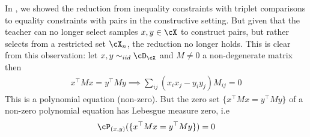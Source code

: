 In , we showed the reduction from inequality constraints with triplet comparisons to equality constraints with pairs in the constructive setting. But given that the teacher can no longer select samples $x,y \in \cX$ to construct pairs, but rather selects from a restricted set $\cX_n$, the reduction no longer holds. This is clear from this observation: let $x,y \sim_{iid} \cD_{\cX}$ and $M \neq 0$ a non-degenerate matrix then
\begin{gather*}
    x^{\top}Mx = y^{\top}My \implies \sum_{ij} (x_ix_j - y_iy_j)M_{ij} = 0
\end{gather*}
This is a polynomial equation (non-zero). But the zero set $\{x^{\top}Mx = y^{\top}My\}$ of a non-zero polynomial equation has Lebesgue measure zero, i.e
\begin{align*}
    \cP_{(x,y)}( \{x^{\top}Mx = y^{\top}My\}) = 0
\end{align*}



